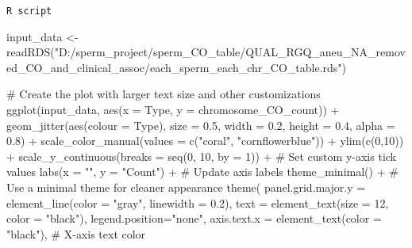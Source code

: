 \documentclass[
  letterpaper,
  DIV=11,
  numbers=noendperiod]{scrreprt}
\newenvironment{Shaded}{\begin{snugshade}}{\end{snugshade}}
\newcommand{\AttributeTok}[1]{\textcolor[rgb]{0.40,0.45,0.13}{#1}}
\newcommand{\CommentTok}[1]{\textcolor[rgb]{0.37,0.37,0.37}{#1}}
\newcommand{\DecValTok}[1]{\textcolor[rgb]{0.68,0.00,0.00}{#1}}
\newcommand{\FloatTok}[1]{\textcolor[rgb]{0.68,0.00,0.00}{#1}}
\newcommand{\FunctionTok}[1]{\textcolor[rgb]{0.28,0.35,0.67}{#1}}
\newcommand{\NormalTok}[1]{\textcolor[rgb]{0.00,0.23,0.31}{#1}}
\newcommand{\OtherTok}[1]{\textcolor[rgb]{0.00,0.23,0.31}{#1}}
\newcommand{\SpecialCharTok}[1]{\textcolor[rgb]{0.37,0.37,0.37}{#1}}
\newcommand{\StringTok}[1]{\textcolor[rgb]{0.13,0.47,0.30}{#1}}
\begin{document}
\begin{codelisting}

\caption{\texttt{R script}}

\begin{Shaded}
\begin{Highlighting}[]
\NormalTok{input\_data }\OtherTok{\textless{}{-}} \FunctionTok{readRDS}\NormalTok{(}\StringTok{"D:/sperm\_project/sperm\_CO\_table/QUAL\_RGQ\_aneu\_NA\_removed\_CO\_and\_clinical\_assoc/each\_sperm\_each\_chr\_CO\_table.rds"}\NormalTok{)}

\CommentTok{\# Create the plot with larger text size and other customizations}
\FunctionTok{ggplot}\NormalTok{(input\_data, }\FunctionTok{aes}\NormalTok{(}\AttributeTok{x =}\NormalTok{ Type, }\AttributeTok{y =}\NormalTok{ chromosome\_CO\_count)) }\SpecialCharTok{+}
  \FunctionTok{geom\_jitter}\NormalTok{(}\FunctionTok{aes}\NormalTok{(}\AttributeTok{colour =}\NormalTok{ Type), }\AttributeTok{size =} \FloatTok{0.5}\NormalTok{, }\AttributeTok{width =} \FloatTok{0.2}\NormalTok{, }\AttributeTok{height =} \FloatTok{0.4}\NormalTok{, }\AttributeTok{alpha =} \FloatTok{0.8}\NormalTok{) }\SpecialCharTok{+}
  \FunctionTok{scale\_color\_manual}\NormalTok{(}\AttributeTok{values =} \FunctionTok{c}\NormalTok{(}\StringTok{"coral"}\NormalTok{, }\StringTok{"cornflowerblue"}\NormalTok{)) }\SpecialCharTok{+}
  \FunctionTok{ylim}\NormalTok{(}\FunctionTok{c}\NormalTok{(}\DecValTok{0}\NormalTok{,}\DecValTok{10}\NormalTok{)) }\SpecialCharTok{+}
  \FunctionTok{scale\_y\_continuous}\NormalTok{(}\AttributeTok{breaks =} \FunctionTok{seq}\NormalTok{(}\DecValTok{0}\NormalTok{, }\DecValTok{10}\NormalTok{, }\AttributeTok{by =} \DecValTok{1}\NormalTok{)) }\SpecialCharTok{+}  \CommentTok{\# Set custom y{-}axis tick values}
  \FunctionTok{labs}\NormalTok{(}\AttributeTok{x =} \StringTok{""}\NormalTok{, }\AttributeTok{y =} \StringTok{"Count"}\NormalTok{) }\SpecialCharTok{+}  \CommentTok{\# Update axis labels}
  \FunctionTok{theme\_minimal}\NormalTok{() }\SpecialCharTok{+}  \CommentTok{\# Use a minimal theme for cleaner appearance}
  \FunctionTok{theme}\NormalTok{(}
    \AttributeTok{panel.grid.major.y =} \FunctionTok{element\_line}\NormalTok{(}\AttributeTok{color =} \StringTok{"gray"}\NormalTok{, }\AttributeTok{linewidth =} \FloatTok{0.2}\NormalTok{),}
    \AttributeTok{text =} \FunctionTok{element\_text}\NormalTok{(}\AttributeTok{size =} \DecValTok{12}\NormalTok{, }\AttributeTok{color =} \StringTok{"black"}\NormalTok{),}
        \AttributeTok{legend.position=}\StringTok{"none"}\NormalTok{,}
        \AttributeTok{axis.text.x =} \FunctionTok{element\_text}\NormalTok{(}\AttributeTok{color =} \StringTok{"black"}\NormalTok{),  }\CommentTok{\# X{-}axis text color}

\end{Highlighting}
\end{Shaded}
\end{codelisting}
\end{document}
